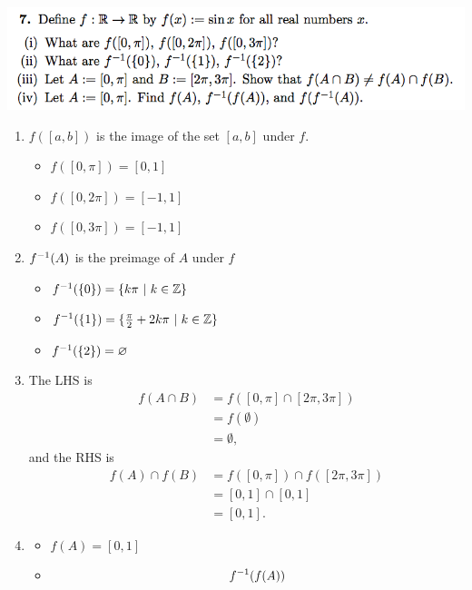 \documentclass[12pt]{article}
\begin{document}
\subsection*{} %
\includegraphics[width=400pt]{img/iulm-1-7.png}
\begin{mdframed}
  \begin{enumerate}[label=(\roman*)]
  \item $f([a,b])$ is the image of the set $[a,b]$ under $f$.
    \begin{itemize}
    \item $f([0, \pi]) = [0, 1]$
    \item $f([0, 2\pi]) = [-1, 1]$
    \item $f([0, 3\pi]) = [-1, 1]$
    \end{itemize}
  \item $f^{-1}(A)$ is the preimage of $A$ under $f$
    \begin{itemize}
    \item $f^{-1}(\{0\}) = \{k\pi~|~k \in \mathbb{Z}\}$
    \item $f^{-1}(\{1\}) = \{\frac{\pi}{2} + 2k\pi ~|~ k \in \mathbb{Z}\}$
    \item $f^{-1}(\{2\}) = \varnothing$
    \end{itemize}
  \item The LHS is
    \begin{align*}
      f(A \cap B)
      &= f([0, \pi] \cap [2\pi,3\pi])\\
      &= f(\emptyset)\\
      &= \emptyset,
    \end{align*}
    and the RHS is
    \begin{align*}
      f(A) \cap f(B)
      &= f([0, \pi]) \cap f([2\pi,3\pi])\\
      &= [0, 1] \cap [0, 1]\\
      &= [0, 1].
    \end{align*}
  \item
    \begin{itemize}
    \item $f(A) = [0, 1]$
    \item
      \begin{align*}
        f^\1(f(A))

\end{align*}
\end{itemize}
\end{enumerate}
\end{mdframed}
\end{document}
